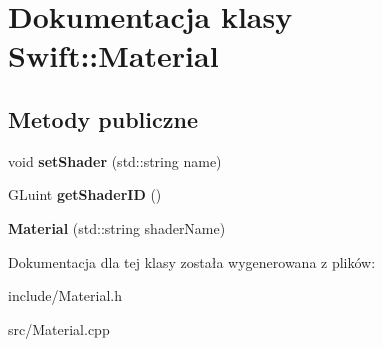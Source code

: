 \hypertarget{class_swift_1_1_material}{\section{Dokumentacja klasy Swift\-:\-:Material}
\label{class_swift_1_1_material}
}
\subsection*{Metody publiczne}
\begin{DoxyCompactItemize}
\item 
\hypertarget{class_swift_1_1_material_af9684f28734d244487c8442f6f32ad70}{void {\bfseries set\-Shader} (std\-::string name)}\label{class_swift_1_1_material_af9684f28734d244487c8442f6f32ad70}

\item 
\hypertarget{class_swift_1_1_material_aba83259cef5253597dd401913024ccac}{G\-Luint {\bfseries get\-Shader\-I\-D} ()}\label{class_swift_1_1_material_aba83259cef5253597dd401913024ccac}

\item 
\hypertarget{class_swift_1_1_material_a89b8a632f2da253bddcb3dec996e1ee8}{{\bfseries Material} (std\-::string shader\-Name)}\label{class_swift_1_1_material_a89b8a632f2da253bddcb3dec996e1ee8}

\end{DoxyCompactItemize}


Dokumentacja dla tej klasy została wygenerowana z plików\-:\begin{DoxyCompactItemize}
\item 
include/Material.\-h\item 
src/Material.\-cpp\end{DoxyCompactItemize}
